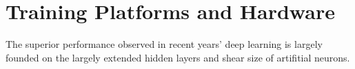 \section{Training Platforms and Hardware}
The superior performance observed in recent years' deep learning is largely founded on the largely extended hidden layers and shear size of artifitial neurons. 